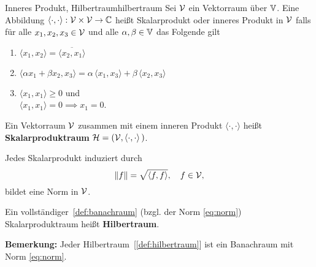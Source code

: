 \begin{boringDef}{Inneres Produkt, Hilbertraum}{hilbertraum}
  Sei $\mathcal{V}$ ein Vektorraum über $\mathbb{V}$.
  Eine Abbildung $\langle\cdot, \cdot\rangle : \mathcal{V}\times\mathcal{V} \to \mathbb{C}$ heißt Skalarprodukt oder inneres Produkt in $\mathcal{V}$ falls für alle $x_{1},x_{2},x_{3} \in \mathcal{V}$ und alle $\alpha,\beta \in \mathbb{V}$ das Folgende gilt
  \begin{enumerate}
          \item $\langle x_{1}, x_{2}\rangle = \overline{\langle x_{2}, x_{1}\rangle}$
          \item $\langle \alpha x_{1} + \beta x_{2}, x_{3} \rangle = \alpha\,\langle x_{1}, x_{3}\rangle + \beta \, \langle x_{2}, x_{3} \rangle$
          \item $\langle x_{1}, x_{1} \rangle \geq 0$ und\\ $\langle x_{1}, x_{1} \rangle = 0 \implies x_{1} = 0$.
  \end{enumerate}
  Ein Vektorraum $\mathcal{V}$ zusammen mit einem inneren Produkt $\langle \cdot, \cdot \rangle$ heißt \textbf{Skalarproduktraum} $\mathcal{H} = (\mathcal{V}, \langle \cdot, \cdot \rangle \,)$.

  Jedes Skalarprodukt induziert durch
  \begin{equation}
    \|f\| = \sqrt{\langle f, f \rangle}, \quad f \in \mathcal{V},\label{eq:norm}
  \end{equation}
  bildet eine Norm in $\mathcal{V}$.

  Ein vollständiger~\ref{def:banachraum} (bzgl. der Norm \eqref{eq:norm}) Skalarproduktraum heißt \textbf{Hilbertraum}.
\end{boringDef}

\textbf{Bemerkung:} Jeder Hilbertraum~[\ref{def:hilbertraum}] ist ein Banachraum mit Norm \eqref{eq:norm}.
